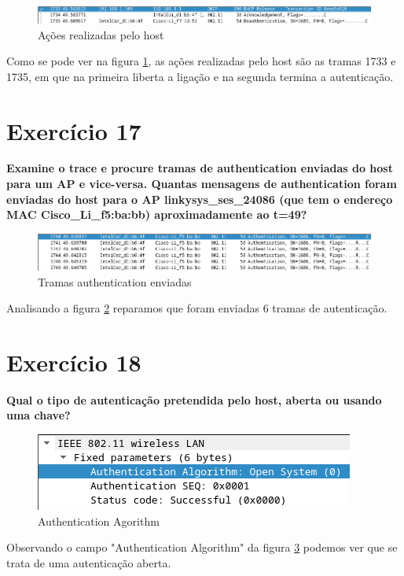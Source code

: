 \documentclass[a4paper]{report}
\begin{document}
\begin{figure}[H]
    \centering 
    \includegraphics[width=\textwidth]{images/acoesEx16.png}  
    \caption{Ações realizadas pelo host}
    \label{fig:acoesEx16}
\end{figure}
Como se pode ver na figura \ref{fig:acoesEx16}, as ações realizadas pelo host
são as tramas 1733 e 1735, em que na primeira liberta a ligação e na segunda 
termina a autenticação.

\section{Exercício 17}
\textbf{Examine o trace e procure tramas de authentication enviadas do host para
um AP e vice-versa. Quantas mensagens de authentication foram enviadas do
host para o AP linkysys\_ses\_24086 (que tem o endereço MAC
Cisco\_Li\_f5:ba:bb) aproximadamente ao t=49?}

\begin{figure}[H]
    \centering 
    \includegraphics[width=\textwidth]{images/authenticationEx17.png}  
    \caption{Tramas authentication enviadas}
    \label{fig:authenticationEx17}
\end{figure}
Analisando a figura \ref{fig:authenticationEx17} reparamos que foram enviadas
6 tramas de autenticação.


\section{Exercício 18}
\textbf{Qual o tipo de autenticação pretendida pelo host, aberta ou usando uma
chave?}\\

\begin{figure}[H]
    \centering 
    \includegraphics[width=\textwidth]{images/authenticationEx18.png}  
    \caption{Authentication Agorithm}
    \label{fig:authenticationEx18}
\end{figure}
Observando o campo "Authentication Algorithm" da figura \ref{fig:authenticationEx18}
podemos ver que se trata de uma autenticação aberta.
\end{document}
